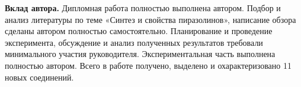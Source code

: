 \textbf{Вклад автора.}
Дипломная работа полностью выполнена автором.
Подбор и анализ литературы по теме «Синтез и свойства пиразолинов», написание обзора сделаны автором полностью самостоятельно.
Планирование и проведение эксперимента, обсуждение и анализ полученных результатов требовали минимального участия руководителя.
Экспериментальная часть выполнена полностью автором.
Всего в работе получено, выделено и охарактеризовано 11 новых соединений.